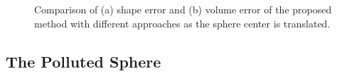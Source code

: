 \begin{figure}[]
	\centering
	\caption{Comparison of (a) shape error and (b) volume error of the proposed method with different approaches as the sphere center is translated.}
	\label{fig:graph3}
\end{figure}
\subsection{{The Polluted Sphere}}
\label{The Polluted Sphere}

